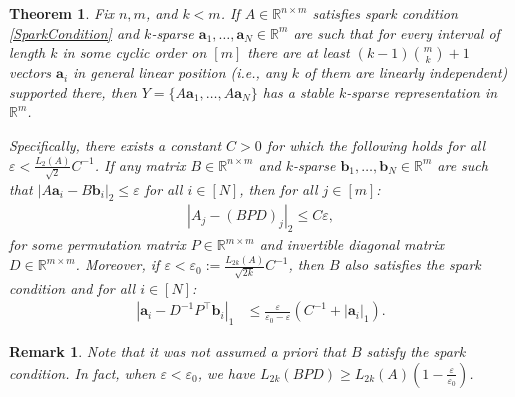 \documentclass[journal, twocolumn]{IEEEtran}
\newtheorem{theorem}{Theorem}
\newtheorem{remark}{Remark}
\begin{document}
\begin{theorem}\label{DeterministicUniquenessTheorem}
Fix $n, m$, and $k < m$. If $A \in \mathbb{R}^{n \times m}$ satisfies spark condition \eqref{SparkCondition} and $k$-sparse \mbox{$\mathbf{a}_1, \ldots, \mathbf{a}_N \in \mathbb{R}^m$} are such that for every interval of length $k$ in some cyclic order on $[m]$ there are at least \mbox{$(k-1){m \choose k}+1$} vectors $\mathbf{a}_i$ in general linear position (i.e., any $k$ of them are linearly independent) supported there, then $Y = \{A\mathbf{a}_1, \ldots, A\mathbf{a}_N\}$ has a stable $k$-sparse representation in $\mathbb{R}^m$.

Specifically, there exists a constant $C > 0$ for which the following holds for all $\varepsilon < \frac{L_2(A)}{\sqrt{2}}C^{-1}$. If any matrix $B \in \mathbb{R}^{n \times m}$ and $k$-sparse $\mathbf{b}_1, \ldots, \mathbf{b}_N \in \mathbb{R}^m$ are such that \mbox{$|A\mathbf{a}_i - B\mathbf{b}_i|_2 \leq \varepsilon$} for all $i \in [N]$, then for all $j \in [m]$:
\begin{align}\label{Cstable}
|A_j-(BPD)_j|_2 \leq C\varepsilon,
\end{align}
%
for some permutation matrix $P \in \mathbb{R}^{m \times m}$ and invertible diagonal matrix $D \in \mathbb{R}^{m \times m}$.  Moreover, if $\varepsilon < \varepsilon_0 := \frac{L_{2k}(A)}{\sqrt{2k}}C^{-1}$, then $B$ also satisfies the spark condition and for all $i \in [N]$:
\begin{align}\label{b-PDa}
|\mathbf{a}_i - D^{-1}P^{\top}\mathbf{b}_i|_1 &\leq \frac{\varepsilon }{ \varepsilon_0 - \varepsilon} \left( C^{-1}+|\mathbf{a}_i|_1 \right).
\end{align}
\end{theorem}

\begin{remark}
Note that it was not assumed a priori that $B$ satisfy the spark condition. In fact, when $\varepsilon < \varepsilon_0$, we have $L_{2k}(BPD) \geq L_{2k}(A)\left( 1 - \frac{\varepsilon}{\varepsilon_0} \right)$.
\end{remark}


\end{document}
